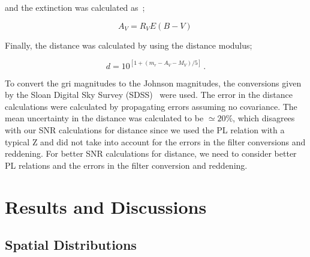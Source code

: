 \documentclass[aps,prb,twocolumn,superscriptaddress]{revtex4-1}
\begin{document}
\noindent and the extinction was calculated as~\cite{Modern};

\begin{equation}
\label{Av}
A_V = R_V E(B-V) \,
\end{equation}

\noindent Finally, the distance was calculated by using the distance modulus;

\begin{equation}
\label{dist}
d = 10^{[1+(m_r - A_V - M_V)/5]} \, .
\end{equation}

\noindent To convert the gri magnitudes to the Johnson magnitudes, the conversions given by the Sloan Digital Sky Survey (SDSS)~\cite{SDSS} were used. The error in the distance calculations were calculated by propagating errors assuming no covariance. The mean uncertainty in the distance was calculated to be $\simeq 20 \%$, which disagrees with our SNR calculations for distance since we used the PL relation with a typical Z and did not take into account for the errors in the filter conversions and reddening. For better SNR calculations for distance, we need to consider better PL relations and the errors in the filter conversion and reddening.  



\section{Results and Discussions}\label{sec:ResDis}

\subsection{Spatial Distributions}
\end{document}
